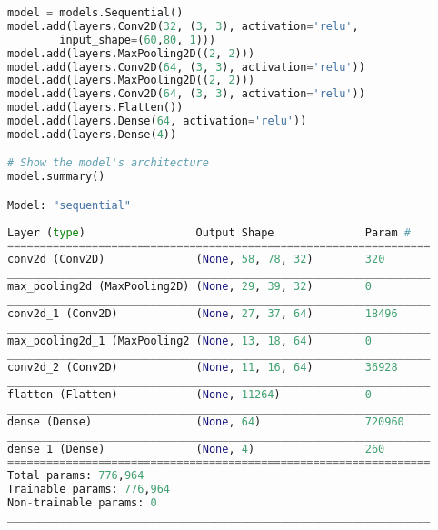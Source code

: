 
\lstset{style=mystyle}

\begin{lstlisting}[language=Python]
model = models.Sequential()
model.add(layers.Conv2D(32, (3, 3), activation='relu', 
        input_shape=(60,80, 1)))
model.add(layers.MaxPooling2D((2, 2)))
model.add(layers.Conv2D(64, (3, 3), activation='relu'))
model.add(layers.MaxPooling2D((2, 2)))
model.add(layers.Conv2D(64, (3, 3), activation='relu'))
model.add(layers.Flatten())
model.add(layers.Dense(64, activation='relu'))
model.add(layers.Dense(4))

# Show the model's architecture
model.summary()

Model: "sequential"
_________________________________________________________________
Layer (type)                 Output Shape              Param #   
=================================================================
conv2d (Conv2D)              (None, 58, 78, 32)        320       
_________________________________________________________________
max_pooling2d (MaxPooling2D) (None, 29, 39, 32)        0         
_________________________________________________________________
conv2d_1 (Conv2D)            (None, 27, 37, 64)        18496     
_________________________________________________________________
max_pooling2d_1 (MaxPooling2 (None, 13, 18, 64)        0         
_________________________________________________________________
conv2d_2 (Conv2D)            (None, 11, 16, 64)        36928     
_________________________________________________________________
flatten (Flatten)            (None, 11264)             0         
_________________________________________________________________
dense (Dense)                (None, 64)                720960    
_________________________________________________________________
dense_1 (Dense)              (None, 4)                 260       
=================================================================
Total params: 776,964
Trainable params: 776,964
Non-trainable params: 0
_________________________________________________________________
\end{lstlisting}


